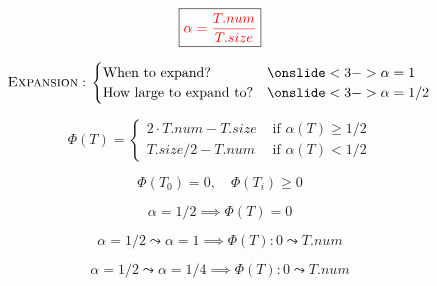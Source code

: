 \begin{frame}{}

  \pause
  \vspace{0.30cm}
\end{frame}

\begin{frame}{}
  \centerline{}

  \[
    \boxed{\textcolor{red}{\alpha = \frac{T.num}{T.size}}}
  \]

  \pause
  \vspace{0.30cm}
  \[
    \textsc{Expansion}: \left.
    \begin{cases}
      \text{When to expand?}		& \onslide<3->{\alpha = 1} \\
      \text{How large to expand to?} 	& \onslide<3->{\alpha = 1/2}
    \end{cases}
    \right.
  \]


\end{frame}

\begin{frame}{}
  \[
    \Phi(T) = \left.
    \begin{cases}
      2 \cdot T.num - T.size & \text{ if } \alpha(T) \ge 1/2	\\
      T.size/2 - T.num	     & \text{ if } \alpha(T) < 1/2
    \end{cases} \right.
  \]

  \pause
  \[
    \Phi(T_0) = 0,\quad \Phi(T_{i}) \ge 0
  \]

  \pause
  \vspace{0.30cm}
  \[
    \alpha = 1/2 \implies \Phi(T) = 0
  \]

  \vspace{0.30cm}
  \pause
  \[
    \alpha = 1/2 \leadsto \alpha = 1 \implies \Phi(T): 0 \leadsto T.num
  \]

  \pause
  \[
    \alpha = 1/2 \leadsto \alpha = 1/4 \implies \Phi(T): 0 \leadsto T.num
  \]
\end{frame}

